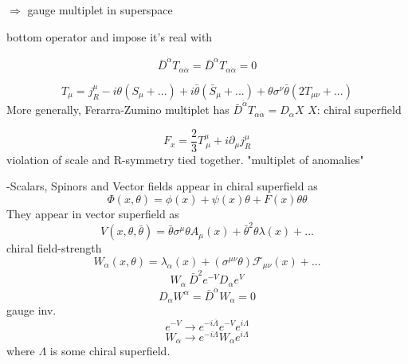 \documentclass[type = bachelor]{fduthesis-en}
\begin{document}
$\Rightarrow$ gauge multiplet in superspace

bottom operator and impose it's real with

\begin{equation}
\label{FZmultiplet}
\bar{D}^{\dot{\alpha}}T_{\alpha\dot{\alpha}}=\bar{D}^{\alpha}T_{\alpha\dot{\alpha}}=0
\end{equation}

\begin{equation}
T_{\mu}=j^{\mu}_R-i\theta(S_{\mu}+...)+i\bar{\theta}(\bar{S}_{\mu}+...)+\theta\sigma^{\nu}\bar{\theta}(2T_{\mu\nu}+...)
\end{equation}
More generally, Ferarra-Zumino multiplet has $\bar{D}^{\dot{\alpha}}T_{\alpha\dot{\alpha}}=D_{\alpha}X$ $X$: chiral superfield

\begin{equation}
F_x=\frac{2}{3}T^{\mu}_{ \ \mu}+i\partial_{\mu}j^{\mu}_R
\end{equation}
violation of scale and R-symmetry tied together. "multiplet of anomalies"

\bigskip
\noindent-Scalars, Spinors and Vector fields appear in chiral superfield as
\begin{equation}
\Phi(x,\theta)=\phi(x)+\psi(x)\theta+F(x)\theta\theta
\end{equation}
They appear in vector superfield as 
\begin{equation}
V(x, \theta, \bar{\theta})=\bar{\theta}\sigma^{\mu}\theta A_{\mu}(x)+\bar{\theta}^2\theta\lambda(x)+...
\end{equation}
chiral field-strength 
\begin{equation}
W_{\alpha}(x,\theta)=\lambda_{\alpha}(x)+(\sigma^{\mu\nu}\theta)\mathcal{F}_{\mu\nu}(x)+...
\end{equation}
\begin{equation}
W_{\alpha}~\bar{D}^2e^{-V}D_{\alpha}e^V
\end{equation}
\begin{equation}
D_{\alpha}W^{\alpha}=\bar{D}^{\dot{\alpha}}W_{\alpha}=0
\end{equation}
gauge inv.
\begin{equation}
e^{-V} \rightarrow e^{-i\bar{\Lambda}}e^{-V}e^{i\Lambda}
\end{equation}
\begin{equation}
W_{\alpha} \rightarrow e^{-i\Lambda}W_{\alpha}e^{i\Lambda}
\end{equation}
where $\Lambda$ is some chiral superfield.
\end{document}
